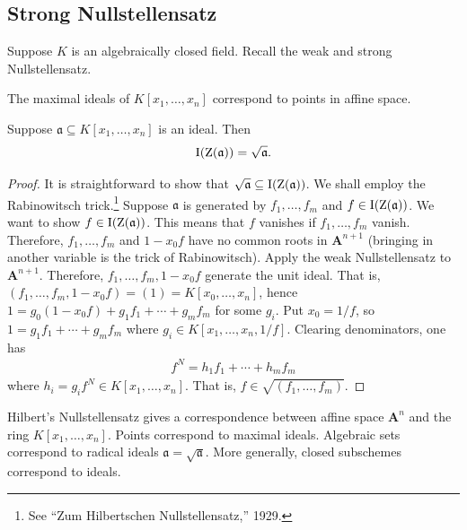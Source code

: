 \documentclass [11 pt, oneside, margin = 1 in] {article}
\begin{document}
\subsection{Strong Nullstellensatz}
Suppose $K$ is an algebraically closed field. Recall the weak and strong Nullstellensatz.

\begin{theorem}\label{}\index{}\text{}
The maximal ideals of $K[x_1,\hdots, x_n]$ correspond to points in affine space.
\end{theorem}

\begin{theorem}\label{}\index{}\text{}
Suppose $\mathfrak{a}\subseteq K[x_1,\hdots, x_n]$ is an ideal. Then 
\begin{align*}
	\operatorname{I}(\operatorname{Z}(\mathfrak{a})) = \sqrt{\mathfrak{a}} .
\end{align*}
\end{theorem}

\begin{proof}
It is straightforward to show that $\sqrt{\mathfrak{a}} \subseteq \operatorname{I}(\operatorname{Z}(\mathfrak{a}))$. We shall employ the Rabinowitsch trick.\footnote{See ``Zum Hilbertschen Nullstellensatz,'' 1929.} Suppose $\mathfrak{a}$ is generated by $f_1,\hdots, f_m$ and $f\in \operatorname{I}(\operatorname{Z}(\mathfrak{a}))$. We want to show $f\in \operatorname{I}(\operatorname{Z}(\mathfrak{a}))$. This means that $f$ vanishes if $f_1,\hdots, f_m$ vanish. Therefore, $f_1,\hdots, f_m$ and $1-x_0f$ have no common roots in $\mathbf{A}^{n+1}$ (bringing in another variable is the trick of Rabinowitsch). Apply the weak Nullstellensatz to $\mathbf{A}^{n+1}$. Therefore, $f_1,\hdots, f_m, 1-x_0f$ generate the unit ideal. That is, $(f_1,\hdots,f_m,1-x_0f) = (1) = K[x_0,\hdots, x_n]$, hence $1 = g_0(1-x_0f)+g_1f_1 +\cdots + g_mf_m$ for some $g_i$. Put $x_0=1/f$, so $1=g_1f_1+\cdots +g_mf_m$ where $g_i \in K[x_1,\hdots, x_n, 1/f]$. Clearing denominators, one has
\begin{align*}
	f^N = h_1f_1+\cdots + h_mf_m
\end{align*}
where $h_i=g_if^N\in K[x_1,\hdots, x_n]$. That is, $f\in \sqrt{(f_1,\hdots, f_m)} $.
\end{proof}

Hilbert's Nullstellensatz gives a correspondence between affine space $\mathbf{A}^n$ and the ring $K[x_1,\hdots, x_n]$. Points correspond to maximal ideals. Algebraic sets correspond to radical ideals $\mathfrak{a} = \sqrt{\mathfrak{a}} $. More generally, closed subschemes correspond to ideals.
\end{document}
